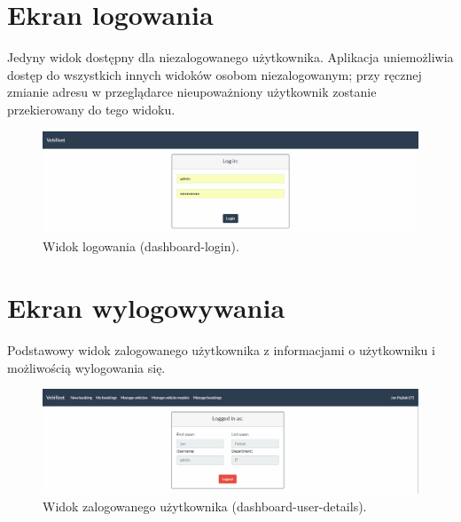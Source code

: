 \documentclass[eng,printmode,openany]{mgr}
\begin{document}
	\section{Ekran logowania}
	Jedyny widok dostępny dla niezalogowanego użytkownika. Aplikacja uniemożliwia dostęp do wszystkich innych widoków osobom niezalogowanym; przy ręcznej zmianie adresu w przeglądarce nieupoważniony użytkownik zostanie przekierowany do tego widoku.
	\begin{figure}[H]
		\centering
		\includegraphics[width=\textwidth]{images/views/dashboard-login.png}
		\caption{Widok logowania (dashboard-login).} 		
	\end{figure}
	
	\section{Ekran wylogowywania}
	Podstawowy widok zalogowanego użytkownika z informacjami o użytkowniku i możliwością wylogowania się.
	\begin{figure}[H]
		\centering
		\includegraphics[width=\textwidth]{images/views/dashboard-logout.png}
		\caption{Widok zalogowanego użytkownika (dashboard-user-details).} 
	\end{figure}
	
\end{document}
